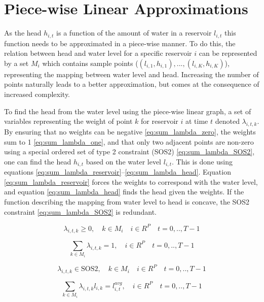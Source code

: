 \newpage
\section{Piece-wise Linear Approximations}
\label{appendix: Piece-wise linear}
As the head $h_{i,t}$ is a function of the amount of water in a reservoir $l_{i,t}$ this function needs to be approximated in a piece-wise manner. To do this, the relation between head and water level for a specific reservoir $i$ can be represented by a set $M_i$ which contains sample points ($(l_{i,1}, h_{i,1}),...,(l_{i,K}, h_{i,K})$), representing the mapping between water level and head. Increasing the number of points naturally leads to a better approximation, but comes at the consequence of increased complexity. 

To find the head from the water level using the piece-wise linear graph, a set of variables representing the weight of point $k$ for reservoir $i$ at time $t$ denoted $\lambda_{i,t,k}$. By ensuring that no weights can be negative \eqref{eq:sum_lambda_zero}, the weights sum to 1 \eqref{eq:sum_lambda_one}, and that only two adjacent points are non-zero using a special ordered set of type 2 constraint (SOS2) \eqref{eq:sum_lambda_SOS2}, one can find the head $h_{i,t}$ based on the water level $l_{i,t}$. This is done using equations \eqref{eq:sum_lambda_reservoir}--\eqref{eq:sum_lambda_head}. Equation \eqref{eq:sum_lambda_reservoir} forces the weights to correspond with the water level, and equation \eqref{eq:sum_lambda_head} finds the head given the weights. If the function describing the mapping from water level to head is concave, the SOS2 constraint \eqref{eq:sum_lambda_SOS2} is redundant. 

\begin{equation}
\label{eq:sum_lambda_zero}
     \lambda_{i,t,k}  \geq 0, \quad  k \in M_{i}  \quad  i\in R^{P} \quad t=0,..,T-1
\end{equation}

\begin{equation}
\label{eq:sum_lambda_one}
    \sum_{k \in M_{i}}  \lambda_{i,t,k} = 1, \quad  i\in R^{P} \quad t=0,..,T-1
\end{equation}

\begin{equation}
\label{eq:sum_lambda_SOS2}
     \lambda_{i,t,k} \in \text{SOS2}, \quad  k \in M_{i} \quad  i\in R^{P} \quad t=0,..,T-1
\end{equation}

\begin{equation}
\label{eq:sum_lambda_reservoir}
    \sum_{k \in M_{i}}  \lambda_{i,t,k} l_{i,k} = l^{avg}_{i,t}, \quad  i\in R^{P} \quad t=0,..,T-1
\end{equation}


